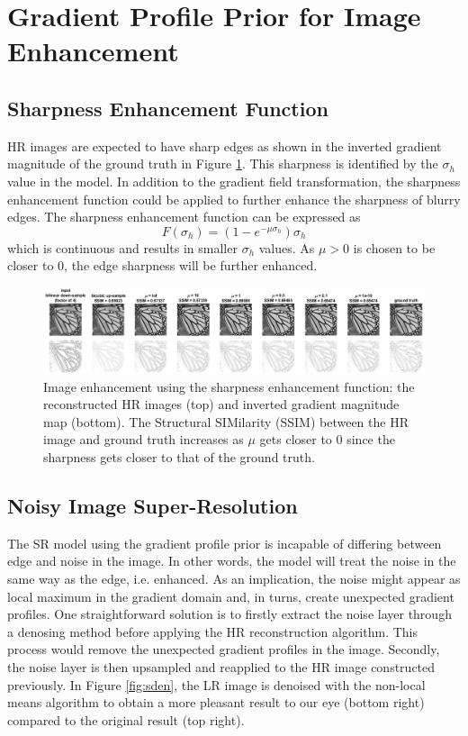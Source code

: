 \documentclass[a4paper,11pt]{article}
\begin{document}
\section{Gradient Profile Prior for Image Enhancement}

\subsection{Sharpness Enhancement Function}

HR images are expected to have sharp edges as shown in the inverted gradient magnitude of the ground truth in Figure \ref{fig:mu}. This sharpness is identified by the $\sigma_h$ value in the model. In addition to the gradient field transformation, the sharpness enhancement function could be applied to further enhance the sharpness of blurry edges. The sharpness enhancement function can be expressed as
\begin{equation}
	F(\sigma_h) = (1-e^{-\mu\sigma_h})\sigma_h
\end{equation}
which is continuous and results in smaller $\sigma_h$ values. As $\mu > 0$ is chosen to be closer to 0, the edge sharpness will be further enhanced.

\begin{figure}[H]
	\centering
	\includegraphics[width=1\textwidth]{mu.png}
	\caption{Image enhancement using the sharpness enhancement function: the reconstructed HR images (top) and inverted gradient magnitude map (bottom). The Structural SIMilarity (SSIM) \cite{ssim04} between the HR image and ground truth increases as $\mu$ gets closer to 0 since the sharpness gets closer to that of the ground truth.}
	\label{fig:mu}
\end{figure}


\subsection{Noisy Image Super-Resolution}

The SR model using the gradient profile prior is incapable of differing between edge and noise in the image. In other words, the model will treat the noise in the same way as the edge, i.e. enhanced. As an implication, the noise might appear as local maximum in the gradient domain and, in turns, create unexpected gradient profiles. One straightforward solution is to firstly extract the noise layer through a denosing method before applying the HR reconstruction algorithm. This process would remove the unexpected gradient profiles in the image. Secondly, the noise layer is then upsampled and reapplied to the HR image constructed previously. In Figure \ref{fig:sden}, the LR image is denoised with the non-local means algorithm \cite{nlm05} to obtain a more pleasant result to our eye (bottom right) compared to the original result (top right).
\end{document}
